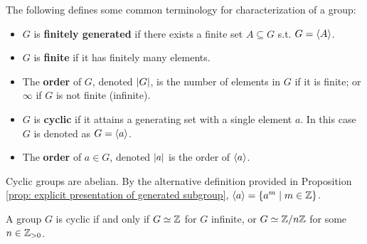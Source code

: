 \documentclass{article}
\begin{document}
\begin{definition}
    The following defines some common terminology for characterization of a group:
    \begin{itemize}
        \item $G$ is \textbf{finitely generated} if there exists a finite set $A \subseteq G$ s.t. $G = \left\langle A \right\rangle$.
        \item $G$ is \textbf{finite} if it has finitely many elements. 
        \item The \textbf{order} of $G$, denoted $\left|G\right|$, is the number of elements in $G$ if it is finite; or $\infty$ if $G$ is not finite (infinite).
        \item $G$ is \textbf{cyclic} if it attains a generating set with a single element $a$. In this case $G$ is denoted as $G = \left\langle a \right\rangle$.
        \item The \textbf{order} of $a \in G$, denoted $\left|a\right|$ is the order of $\left\langle a \right\rangle$.  
    \end{itemize}
\end{definition}

\begin{remark}
    Cyclic groups are abelian. By the alternative definition provided in Proposition \ref{prop: explicit presentation of generated subgroup}, $\left\langle a \right\rangle = \{ a^m \mid m \in \mathbb{Z} \}$.
\end{remark}

\begin{proposition}\label{prop: characterization of cyclic group}
    A group $G$ is cyclic if and only if $G \simeq \mathbb{Z}$ for $G$ infinite, or $G \simeq \mathbb{Z}/n\mathbb{Z}$ for some $n \in \mathbb{Z}_{>0}$.  
\end{proposition}
\end{document}
